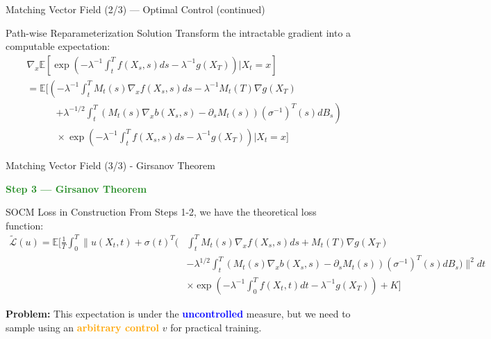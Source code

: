 \documentclass[aspectratio=169,xcolor=dvipsnames]{beamer}
\begin{document}
\begin{frame}[allowframebreaks]{Matching Vector Field (2/3) — Optimal Control (continued)}
    \begin{alertblock}{Path-wise Reparameterization Solution}
        Transform the intractable gradient into a computable expectation:
        \begin{equation}
        \begin{aligned}
        &\nabla_x \mathbb{E}\left[\exp\left(-\lambda^{-1}\int_t^T f(X_s,s)ds - \lambda^{-1}g(X_T)\right) \bigg| X_t = x\right] \\[6pt]
        &= \mathbb{E}\Bigg[\left(-\lambda^{-1}\int_t^T M_t(s)\nabla_x f(X_s,s)ds - \lambda^{-1}M_t(T)\nabla g(X_T)\right. \\[4pt]
        &\qquad\quad \left.+ \lambda^{-1/2}\int_t^T (M_t(s)\nabla_x b(X_s,s) - \partial_s M_t(s))(\sigma^{-1})^T(s)dB_s\right) \\[4pt]
        &\qquad\quad \times \exp\left(-\lambda^{-1}\int_t^T f(X_s,s)ds - \lambda^{-1}g(X_T)\right) \bigg| X_t = x\Bigg]
        \end{aligned}
        \end{equation}
    \end{alertblock}
    

\end{frame}

\begin{frame}[allowframebreaks]{Matching Vector Field (3/3) - Girsanov Theorem}

    \begin{center}
        \Large\textcolor{ForestGreen}{\textbf{Step 3 — Girsanov Theorem}}
    \end{center}
    
    \vspace{0.3cm}
    
    \begin{block}{SOCM Loss in Construction}
        From Steps 1-2, we have the theoretical loss function:
        \begin{equation}
        \begin{aligned}
        \tilde{\mathcal{L}}(u) = \mathbb{E}\Bigg[\frac{1}{T}\int_0^T \Bigg\|u(X_t,t) + \sigma(t)^T \Bigg(
        &\int_t^T M_t(s)\nabla_x f(X_s,s)ds + M_t(T)\nabla g(X_T) \\[4pt]
        &- \lambda^{1/2}\int_t^T (M_t(s)\nabla_x b(X_s,s) - \partial_s M_t(s))(\sigma^{-1})^T(s)dB_s
        \Bigg)\Bigg\|^2 dt \\[4pt]
        &\times \exp\left(-\lambda^{-1}\int_0^T f(X_t,t)dt - \lambda^{-1}g(X_T)\right) + K\Bigg]
        \end{aligned}
        \end{equation}
        
        \textbf{Problem:} This expectation is under the \textcolor{blue}{\textbf{uncontrolled}} measure, but we need to sample using an \textcolor{orange}{\textbf{arbitrary control}} $v$ for practical training.
    \end{block}

\end{frame}
\end{document}
